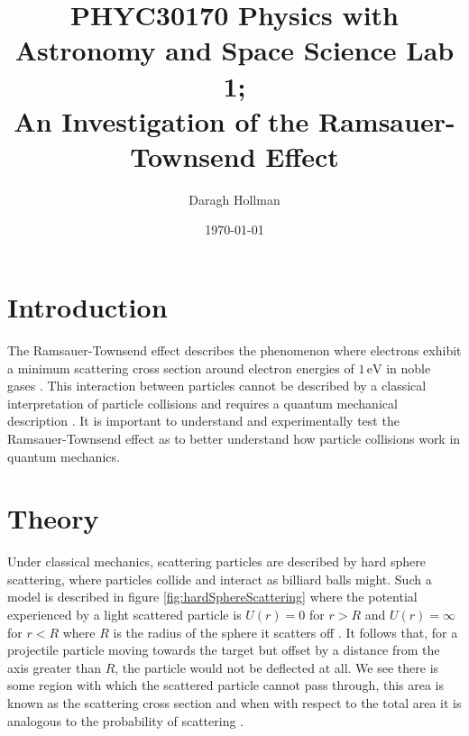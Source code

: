 \documentclass[%
reprint,
amsmath,amssymb,
aps,
floatfix
]{revtex4-2}
\begin{document}
	
	
	\title{PHYC30170 Physics with Astronomy and Space Science Lab 1;\\An Investigation of the Ramsauer-Townsend Effect}
	
	\author{Daragh Hollman}
	
	\date{\today}
	\maketitle
	
	\section{Introduction}
	The Ramsauer-Townsend effect describes the phenomenon where electrons exhibit a minimum scattering cross section around electron energies of $1\,\text{eV}$ in noble gases \cite{wisconsin}. This interaction between particles cannot be described by a classical interpretation of particle collisions and requires a quantum mechanical description \cite{texas}. It is important to understand and experimentally test the Ramsauer-Townsend effect as to better understand how particle collisions work in quantum mechanics.
	
	\section{Theory}	
	Under classical mechanics, scattering particles are described by hard sphere scattering, where particles collide and interact as billiard balls might. Such a model is described in figure \ref{fig:hardSphereScattering} where the potential experienced by a light scattered particle is $U(r) = 0$ for $r > R$ and $U(r) = \infty$ for $r < R$ where $R$ is the radius of the sphere it scatters off \cite{santaBarbara}. It follows that, for a projectile particle moving towards the target but offset by a distance from the axis greater than $R$, the particle would not be deflected at all. We see there is some region with which the scattered particle cannot pass through, this area is known as the scattering cross section and when with respect to the total area it is analogous to the probability of scattering \cite{santaBarbara}.\\
	
\end{document}
